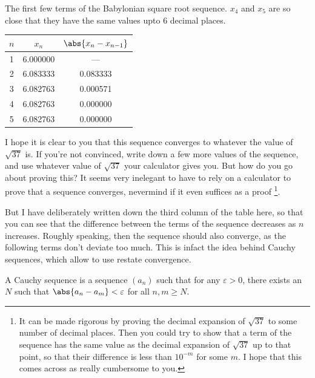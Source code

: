 \begin{table}[H]
\begin{sidecaption}{The first few terms of the Babylonian square root sequence. $x_4$ and
$x_5$ are so close that they have the same values upto 6 decimal places.}
\begin{center}
\begin{tabular}{c c c}
\toprule
$n$ & $x_n$ & $\abs{x_n - x_{n-1}}$ \\
\midrule
1 & 6.000000 & --- \\
2 & 6.083333 & 0.083333 \\
3 & 6.082763 & 0.000571 \\
4 & 6.082763 & 0.000000 \\
5 & 6.082763 & 0.000000 \\
\bottomrule
\end{tabular}
\end{center}
\end{sidecaption}
\end{table}

I hope it is clear to you that this sequence converges to whatever the value of $\sqrt{37}$ is.
If you're not convinced, write down a few more values of the sequence, and use whatever value
of $\sqrt{37}$ your calculator gives you. But how do you go about proving this?
It seems very inelegant to have to rely on a calculator to prove that a sequence converges,
nevermind if it even suffices as a proof \footnote[-2.2cm]{It can be made rigorous by proving the
decimal expansion of $\sqrt{37}$ to some number of decimal places. Then you could try to show
that a term of the sequence has the same value as the decimal expansion of $\sqrt{37}$ up to that point,
so that their difference is less than $10^{-m}$ for some $m$. I hope that this comes
across as really cumbersome to you.}.

But I have deliberately written down the third column of the table here,
so that you can see that the difference between the terms of the sequence
decreases as $n$ increases. Roughly speaking, then the sequence should also converge,
as the following terms don't deviate too much. This is infact the idea behind
Cauchy sequences, which allow to use restate convergence.

\begin{definition}
A Cauchy sequence is a sequence $(a_n)$ such that for any $\varepsilon > 0$, there exists an $N$ such that
$\abs{a_n - a_m} < \varepsilon$ for all $n, m \geq N$.
\end{definition}

